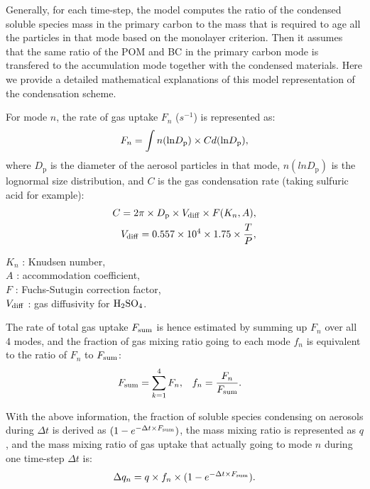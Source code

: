 \documentclass[12pt, fullpage]{uiucthesis2009}
\begin{document}
	Generally, for each time-step, the model computes the ratio of the condensed soluble species mass in the primary carbon to the mass that is required to age all the particles in that mode based on the monolayer criterion. Then it assumes that the same ratio of the POM and BC in the primary carbon mode is transfered to the accumulation mode together with the condensed materials. Here we provide a detailed mathematical explanations of this model representation of the condensation scheme. 
	
	For mode $n$, the rate of gas uptake $F_{n}$ ($s^{-1}$) is represented as:
	\begin{equation}
	F_{n} = \int n(\text{ln}D_{\rm{p}})\times C d(\text{ln}D_\text{p}) ,
	\end{equation}
	where $D_\text{p}$ is the diameter of the aerosol particles in that mode, $n(lnD_\text{p})$ is the lognormal size distribution, and $C$ is the gas condensation rate (taking sulfuric acid for example):
	\begin{align}
	C = 2\pi \times D_\text{p} \times V_{\rm{diff}} \times F(K_{n}, A) ,\\
	V_{\rm{diff}} = 0.557 \times 10^4 \times 1.75 \times \frac{T}{P}, 
	\end{align}
	
	
	\begin{flushleft}
		$K_{n}$ : Knudsen number, \\
		$A$ : accommodation coefficient, \\
		$F$ : Fuchs-Sutugin correction factor, \\
		$V_{\rm{diff}}$ : gas diffusivity for  $\rm{H_2SO_4}$.
	\end{flushleft}
	The rate of total gas uptake $F_{\rm{sum}}$ is hence estimated by summing up $F_{n}$ over all 4 modes, and the fraction of gas mixing ratio going to each mode $f_{n}$ is equivalent to the ratio of $F_{n}$ to $F_{\rm{sum}}$:
	\begin{align}
	F_{\rm{sum}}  &= \sum_{k=1}^4 F_{n},         &
	f_{n}          &= \frac{F_{n}}{F_{\rm{sum}}}. 
	\end{align}
	
	With the above information, the fraction of soluble species condensing on aerosols during $\Delta t$ is derived as $(1 - e^{-\Delta t\times F_{\rm{sum}}})$, the mass mixing ratio is represented as $q$, and the mass mixing ratio of gas uptake that actually going to mode $n$ during one time-step $\Delta t$ is:
	\begin{equation}
	\Delta q_{n} = q \times f_{n} \times (1 - e^{-\Delta t\times F_ {\rm{sum}}}).
	\end{equation}
	
\end{document}
